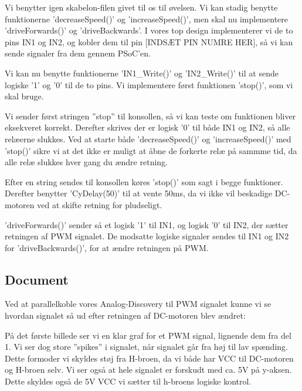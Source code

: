 \documentclass[../main.tex]{subfiles}
\begin{document}
Vi benytter igen skabelon-filen givet til os til øvelsen. Vi kan stadig benytte funktionerne ’decreaseSpeed()’ og ’increaseSpeed()’, men skal nu implementere ’driveForwards()’ og ’driveBackwards’. I vores top design implementerer vi de to pins IN1 og IN2, og kobler dem til pin [INDSÆT PIN NUMRE HER], så vi kan sende signaler fra dem gennem PSoC’en.


Vi kan nu benytte funktionerne ’IN1\_Write()’ og ’IN2\_Write()’ til at sende logiske ’1’ og ’0’ til de to pins. Vi implementere først funktionen ’stop()’, som vi skal bruge.


Vi sender først stringen ”stop” til konsollen, så vi kan teste om funktionen bliver eksekveret korrekt. Derefter skrives der er logisk ’0’ til både IN1 og IN2, så alle relæerne slukkes. Ved at starte både ’decreaseSpeed()’ og ’increaseSpeed()’ med ’stop()’ sikre vi at det ikke er muligt at åbne de forkerte relæ på sammme tid, da alle relæ slukkes hver gang du ændre retning.


Efter en string sendes til konsollen køres ’stop()’ som sagt i begge funktioner. Derefter benytter ’CyDelay(50)’ til at vente 50ms, da vi ikke vil beskadige DC-motoren ved at skifte retning for pludseligt.
 
’driveForwards()’ sender så et logisk ’1’ til IN1, og logisk ’0’ til IN2, der sætter retningen af PWM signalet. De modsatte logiske signaler sendes til IN1 og IN2 for ’driveBackwards()’, for at ændre retningen på PWM.

\subsection{Document}
Ved at parallelkoble vores Analog-Discovery til PWM signalet kunne vi se hvordan signalet så ud efter retningen af DC-motoren blev ændret:


På det første billede ser vi en klar graf for et PWM signal, lignende dem fra del 1. Vi ser dog store ”spikes” i signalet, når signalet går fra høj til lav spænding. Dette formoder vi skyldes støj fra H-broen, da vi både har VCC til DC-motoren og H-broen selv. Vi ser også at hele signalet er forskudt med ca. 5V på y-aksen. Dette skyldes også de 5V VCC vi sætter til h-broens logiske kontrol.
\end{document}
